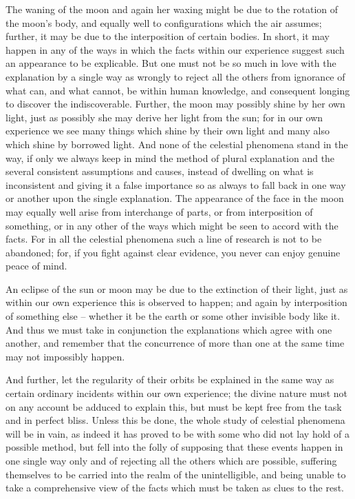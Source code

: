 \documentclass{stex}
\begin{document}
The waning of the moon and again her waxing might be due to the rotation of the moon's body, and equally well to configurations which the air assumes; further, it may be due to the interposition of certain bodies.
In short, it may happen in any of the ways in which the facts within our experience suggest such an appearance to be explicable.
But one must not be so much in love with the explanation by a single way as wrongly to reject all the others from ignorance of what can, and what cannot, be within human knowledge, and consequent longing to discover the indiscoverable.
Further, the moon may possibly shine by her own light, just as possibly she may derive her light from the sun; for in our own experience we see many things which shine by their own light and many also which shine by borrowed light.
And none of the celestial phenomena stand in the way, if only we always keep in mind the method of plural explanation and the several consistent assumptions and causes, instead of dwelling on what is inconsistent and giving it a false importance so as always to fall back in one way or another upon the single explanation.
The appearance of the face in the moon may equally well arise from interchange of parts, or from interposition of something, or in any other of the ways which might be seen to accord with the facts.
For in all the celestial phenomena such a line of research is not to be abandoned; for, if you fight against clear evidence, you never can enjoy genuine peace of mind.

An eclipse of the sun or moon may be due to the extinction of their light, just as within our own experience this is observed to happen; and again by interposition of something else – whether it be the earth or some other invisible body like it.
And thus we must take in conjunction the explanations which agree with one another, and remember that the concurrence of more than one at the same time may not impossibly happen.

And further, let the regularity of their orbits be explained in the same way as certain ordinary incidents within our own experience; the divine nature must not on any account be adduced to explain this, but must be kept free from the task and in perfect bliss.
Unless this be done, the whole study of celestial phenomena will be in vain, as indeed it has proved to be with some who did not lay hold of a possible method, but fell into the folly of supposing that these events happen in one single way only and of rejecting all the others which are possible, suffering themselves to be carried into the realm of the unintelligible, and being unable to take a comprehensive view of the facts which must be taken as clues to the rest.
\end{document}
